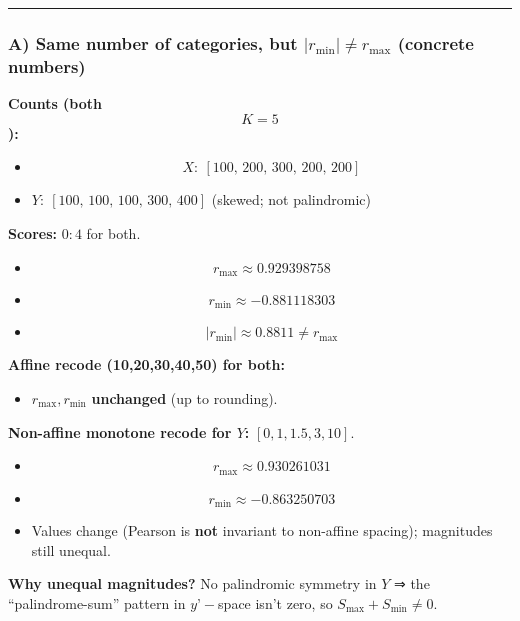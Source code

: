 \documentclass[
  12pt,
]{article}
\providecommand{\tightlist}{%
  \setlength{\itemsep}{0pt}\setlength{\parskip}{0pt}}
\theoremstyle{plain}
\theoremstyle{definition}
\theoremstyle{remark}
\begin{document}
\begin{center}\rule{0.5\linewidth}{0.5pt}\end{center}

\subsubsection{\texorpdfstring{A) \textbf{Same number of categories, but
\(|r_{\min}|\ne r_{\max}\)} (concrete
numbers)}{A) Same number of categories, but \textbar r\_\{\textbackslash min\}\textbar\textbackslash ne r\_\{\textbackslash max\} (concrete numbers)}}\label{a-same-number-of-categories-but-r_minne-r_max-concrete-numbers}

\textbf{Counts (both \[K=5\]):}

\begin{itemize}
\item
  \[X:\ [100,\,200,\,300,\,200,\,200]\]
\item
  \(Y:\ [100,\,100,\,100,\,300,\,400]\) (skewed; not palindromic)
\end{itemize}

\textbf{Scores:} \(0{:}4\) for both.

\begin{itemize}
\item
  \[r_{\max}\approx 0.929398758\]
\item
  \[r_{\min}\approx -0.881118303\]
\item
  \[|r_{\min}| \approx 0.8811 \ne r_{\max}\]
\end{itemize}

\textbf{Affine recode (10,20,30,40,50) for both:}

\begin{itemize}
\tightlist
\item
  \(r_{\max}, r_{\min}\) \textbf{unchanged} (up to rounding).
\end{itemize}

\textbf{Non-affine monotone recode for \(Y\):} \([0,1,1.5,3,10]\).

\begin{itemize}
\item
  \[r_{\max}\approx 0.930261031\]
\item
  \[r_{\min}\approx -0.863250703\]
\item
  Values change (Pearson is \textbf{not} invariant to non-affine
  spacing); magnitudes still unequal.
\end{itemize}

\textbf{Why unequal magnitudes?} No palindromic symmetry in \(Y\) ⇒ the
``palindrome-sum'' pattern in \(y’-\)space isn't zero, so
\(S_{\max}+S_{\min}\ne 0\).
\end{document}
